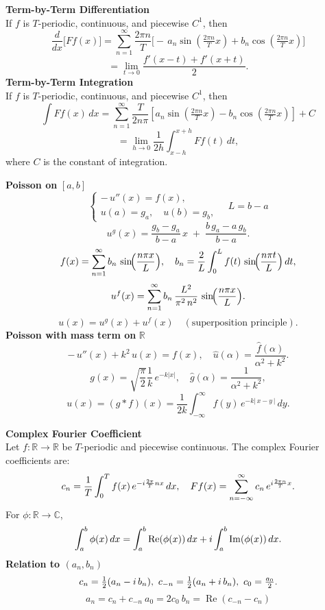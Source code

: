 \documentclass[8pt]{article}
\begin{document}
\begin{multicols}{2}
\small

\noindent \textbf{Term-by-Term Differentiation}\\
If $f$ is $T$-periodic, continuous, and piecewise $C^1$, then
\[
  \frac{d}{dx}\bigl[Ff(x)\bigr]
  = \sum_{n=1}^\infty \frac{2\pi n}{T}\bigl[-\,a_n\sin(\tfrac{2\pi n}{T}x)
    +b_n\cos(\tfrac{2\pi n}{T}x)\bigr]
\]
\[
  = \lim_{t \to 0} \frac{f'(x - t) + f'(x + t)}{2}.
\]
\noindent \textbf{Term-by-Term Integration}\\
If $f$ is $T$-periodic, continuous, and piecewise $C^1$, then
\[
  \int Ff(x)\,dx
  = \sum_{n=1}^\infty \frac{T}{2 n \pi} \left[ a_n \sin\left(\tfrac{2\pi n}{T}x\right)
        - b_n \cos\left(\tfrac{2\pi n}{T}x\right) \right] + C
\]
\[
  = \lim_{h \to 0} \frac{1}{2h} \int_{x - h}^{x + h} Ff(t)\,dt,
\]
where $C$ is the constant of integration.

\noindent \textbf{Poisson on }$[a,b]$
\[
\begin{cases}
-\,u''(x)=f(x),\\[2pt]
u(a)=g_a,\quad u(b)=g_b,
\end{cases}
\quad
L = b - a
\]
\[
u^g(x)=\frac{g_b-g_a}{b-a}\,x \;+\;\frac{b\,g_a - a\,g_b}{b-a}.
\]
\[
f(x)=\sum_{n=1}^{\infty} b_n \,\sin\!\Bigl(\frac{n\pi x}{L}\Bigr),
\quad
b_n=\frac{2}{L}\int_{0}^{L}f(t)\,\sin\!\Bigl(\frac{n\pi t}{L}\Bigr)\,dt,
\]
\[
u^f(x)=\sum_{n=1}^{\infty} b_n \,\frac{L^2}{\pi^2\,n^2}
\,\sin\!\Bigl(\frac{n\pi x}{L}\Bigr).
\]
\[
u(x)=u^g(x)+u^f(x) \quad (\text{superposition principle}).
\]
\noindent \textbf{Poisson with mass term on }$\mathbb{R}$ \vspace{-5px}
\[
-\,u''(x)+k^2\,u(x)=f(x),
\quad
\widehat{u}(\alpha)=\frac{\widehat{f}(\alpha)}{\alpha^2 + k^2}.
\]
\vspace{-5px}
\[
g(x)=\sqrt{\frac{\pi}{2}} \frac{1}{k}\,e^{-k|x|},
\quad
\widehat{g}(\alpha)=\frac{1}{\alpha^2 + k^2},
\]
\vspace{-5px}\[
u(x)=(g*f)(x)
=\frac{1}{2k}\!\int_{-\infty}^{\infty} f(y)\,e^{-k|\,x-y\,|}\,dy.
\]

\columnbreak

\noindent \textbf{Complex Fourier Coefficient}\\
Let \( f : \mathbb{R} \to \mathbb{R} \) be \( T \)-periodic and piecewise continuous.  The complex Fourier coefficients are:
\[
  c_n = \frac{1}{T} \int_0^T f(x)\, e^{-i \frac{2\pi}{T} n x} \, dx,
  \quad
  Ff(x) = \sum_{n=-\infty}^{\infty} c_{n}\,e^{i\frac{2\pi n}{T}x}.\vspace{-10px}
\]
For \( \phi : \mathbb{R} \to \mathbb{C} \), \vspace{-5px}
\[ \int_a^b \phi(x)\,dx
  = \int_a^b \operatorname{Re}(\phi(x)) \, dx + i \int_a^b \operatorname{Im}(\phi(x)) \, dx. \vspace{-5px}
\]
\noindent \textbf{Relation to \( (a_n, b_n) \)}\quad
\[ \vspace{-5px}
  c_{n} = \tfrac{1}{2}(a_{n} - i\,b_{n}),\
  c_{-n} = \tfrac{1}{2}(a_{n} + i\,b_{n}),\
  c_{0} = \tfrac{a_{0}}{2}.\]\[
  a_{n} = c_n + c_{-n}\
  a_{0} = 2 c_0 \
  b_n = \operatorname{Re}(c_{-n} - c_n)
\]


\end{multicols}
\end{document}
